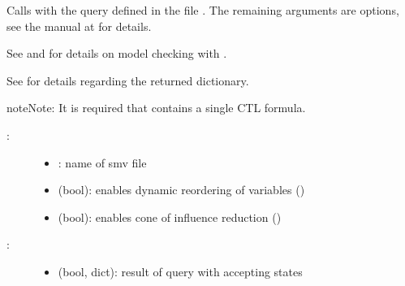\documentclass[letterpaper,10pt,english]{sphinxmanual}
\begin{document}
\begin{fulllineitems}
\label{\detokenize{ModelChecking:PyBoolNet.ModelChecking.check_smv_with_acceptingstates}}
Calls {\hyperref[\detokenize{Installation:installation-nusmv}]{}} with the query defined in the  file .
The remaining arguments are {\hyperref[\detokenize{Installation:installation-nusmv}]{}} options, see the manual at  for details.

See {\hyperref[\detokenize{ModelChecking:primes2smv}]{}} and {\hyperref[\detokenize{Manual:sec-model-checking}]{}} for details on model checking with .

See {\hyperref[\detokenize{ModelChecking:check-primes-with-acceptingstates}]{}} for details regarding the returned  dictionary.

\begin{sphinxadmonition}{note}{Note:}
It is required that  contains a single CTL formula.
\end{sphinxadmonition}
\begin{description}
\item[{:}] \leavevmode\begin{itemize}
\item {} 
: name of smv file

\item {} 
 (bool): enables dynamic reordering of variables ()

\item {} 
 (bool): enables cone of influence reduction ()

\end{itemize}

\item[{:}] \leavevmode\begin{itemize}
\item {} 
 (bool, dict): result of query with accepting states


\end{itemize}
\end{description}
\end{fulllineitems}
\end{document}
